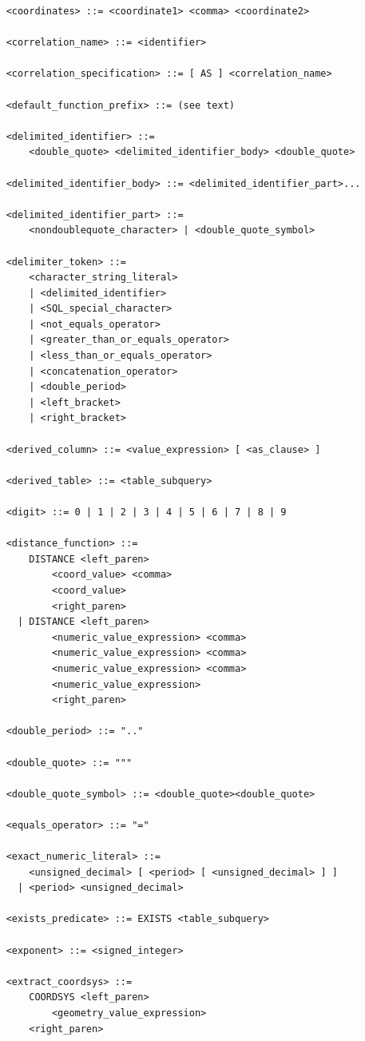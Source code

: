 \documentclass[11pt,a4paper]{ivoa}
\begin{document}
\begin{verbatim}
    <coordinates> ::= <coordinate1> <comma> <coordinate2>

    <correlation_name> ::= <identifier>

    <correlation_specification> ::= [ AS ] <correlation_name>

    <default_function_prefix> ::= (see text)

    <delimited_identifier> ::=
        <double_quote> <delimited_identifier_body> <double_quote>

    <delimited_identifier_body> ::= <delimited_identifier_part>...

    <delimited_identifier_part> ::=
        <nondoublequote_character> | <double_quote_symbol>

    <delimiter_token> ::=
        <character_string_literal>
        | <delimited_identifier>
        | <SQL_special_character>
        | <not_equals_operator>
        | <greater_than_or_equals_operator>
        | <less_than_or_equals_operator>
        | <concatenation_operator>
        | <double_period>
        | <left_bracket>
        | <right_bracket>

    <derived_column> ::= <value_expression> [ <as_clause> ]

    <derived_table> ::= <table_subquery>

    <digit> ::= 0 | 1 | 2 | 3 | 4 | 5 | 6 | 7 | 8 | 9

    <distance_function> ::=
        DISTANCE <left_paren>
            <coord_value> <comma>
            <coord_value>
            <right_paren>
      | DISTANCE <left_paren>
            <numeric_value_expression> <comma>
            <numeric_value_expression> <comma>
            <numeric_value_expression> <comma>
            <numeric_value_expression>
            <right_paren>

    <double_period> ::= ".."

    <double_quote> ::= """

    <double_quote_symbol> ::= <double_quote><double_quote>

    <equals_operator> ::= "="

    <exact_numeric_literal> ::=
        <unsigned_decimal> [ <period> [ <unsigned_decimal> ] ]
      | <period> <unsigned_decimal>

    <exists_predicate> ::= EXISTS <table_subquery>

    <exponent> ::= <signed_integer>

    <extract_coordsys> ::=
        COORDSYS <left_paren>
            <geometry_value_expression>
        <right_paren>


\end{verbatim}
\end{document}
